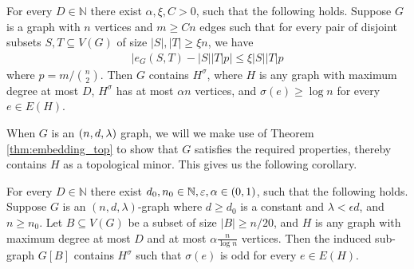 \documentclass[11pt]{article}
\begin{document}
\begin{theorem} \label{thm:embedding_top}
For every $D \in \mathbb{N}$ there exist $\alpha, \xi, C > 0$, such that the following holds. Suppose $G$ is a graph with $n$ vertices and $m \ge Cn$ edges such that for every pair of disjoint subsets $S, T \subseteq V(G)$ of size $|S|, |T| \ge \xi n$, we have
\begin{align}
  \bigl| e_{G}(S, T) - |S||T|p \bigr| \le \xi |S||T| p \label{eq:props}
\end{align}
where $p = m / \binom{n}{2}$. Then $G$ contains $H^{\sigma}$, where $H$ is any graph with maximum degree at most $D$, $H^\sigma$ has at most $\alpha n$ vertices, and $\sigma(e) \ge \log n$ for every $e \in E(H)$.
\end{theorem}

When $G$ is an $(n, d, \lambda)$ graph, we will we make use of Theorem \ref{thm:embedding_top} to show that $G$ satisfies the required properties, thereby contains $H$ as a topological minor.
This gives us the following corollary.
\begin{corollary} \label{cor:embedding_top}
  For every $D \in \mathbb{N}$ there exist $d_0, n_0 \in \mathbb{N}, \varepsilon, \alpha \in (0,1)$, such that the following holds. 
  Suppose $G$ is an $(n,d,\lambda)$-graph where $d \ge d_0$ is a constant  and $\lambda < \epsilon d$, and $n \ge n_0$. 
  Let $B \subseteq V(G)$ be a subset of size $|B| \ge n/20$, and $H$ is any graph with maximum degree at most $D$ and at most $\alpha \frac{n}{\log n}$ vertices.
Then the induced sub-graph $G[B]$ contains $H^{\sigma}$ such that $\sigma(e)$ is odd for every $e \in E(H)$.
\end{corollary}
\end{document}
